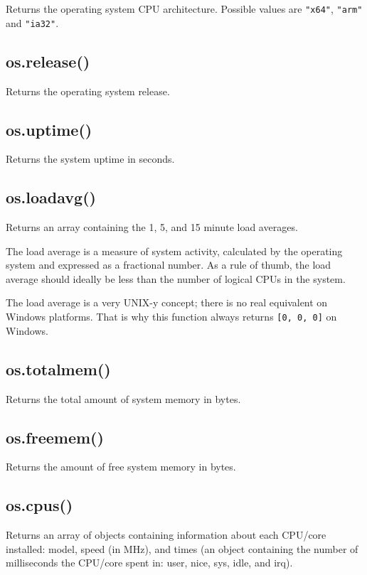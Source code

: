 Returns the operating system CPU architecture. Possible values are
\texttt{"x64"}, \texttt{"arm"} and \texttt{"ia32"}.

\subsection{os.release()}\label{os.release}

Returns the operating system release.

\subsection{os.uptime()}\label{os.uptime}

Returns the system uptime in seconds.

\subsection{os.loadavg()}\label{os.loadavg}

Returns an array containing the 1, 5, and 15 minute load averages.

The load average is a measure of system activity, calculated by the
operating system and expressed as a fractional number. As a rule of
thumb, the load average should ideally be less than the number of
logical CPUs in the system.

The load average is a very UNIX-y concept; there is no real equivalent
on Windows platforms. That is why this function always returns
\texttt{{[}0, 0, 0{]}} on Windows.

\subsection{os.totalmem()}\label{os.totalmem}

Returns the total amount of system memory in bytes.

\subsection{os.freemem()}\label{os.freemem}

Returns the amount of free system memory in bytes.

\subsection{os.cpus()}\label{os.cpus}

Returns an array of objects containing information about each CPU/core
installed: model, speed (in MHz), and times (an object containing the
number of milliseconds the CPU/core spent in: user, nice, sys, idle, and
irq).

